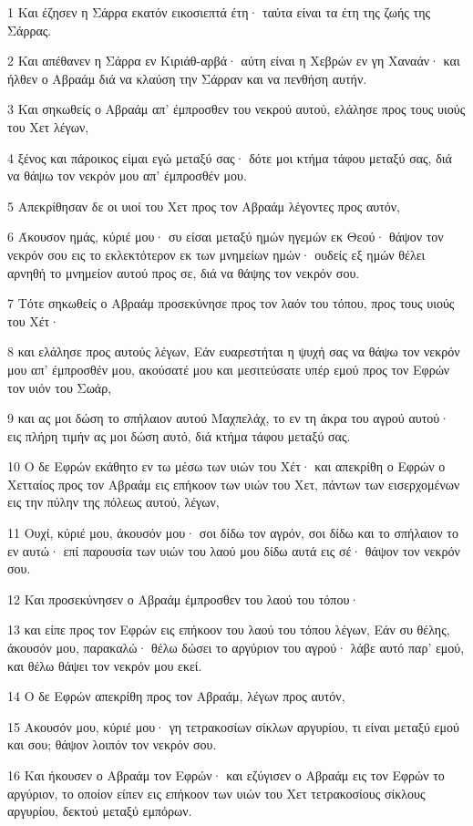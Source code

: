 \par 1 Και έζησεν η Σάρρα εκατόν εικοσιεπτά έτη· ταύτα είναι τα έτη της ζωής της Σάρρας.
\par 2 Και απέθανεν η Σάρρα εν Κιριάθ-αρβά· αύτη είναι η Χεβρών εν γη Χαναάν· και ήλθεν ο Αβραάμ διά να κλαύση την Σάρραν και να πενθήση αυτήν.
\par 3 Και σηκωθείς ο Αβραάμ απ' έμπροσθεν του νεκρού αυτού, ελάλησε προς τους υιούς του Χετ λέγων,
\par 4 ξένος και πάροικος είμαι εγώ μεταξύ σας· δότε μοι κτήμα τάφου μεταξύ σας, διά να θάψω τον νεκρόν μου απ' έμπροσθέν μου.
\par 5 Απεκρίθησαν δε οι υιοί του Χετ προς τον Αβραάμ λέγοντες προς αυτόν,
\par 6 Άκουσον ημάς, κύριέ μου· συ είσαι μεταξύ ημών ηγεμών εκ Θεού· θάψον τον νεκρόν σου εις το εκλεκτότερον εκ των μνημείων ημών· ουδείς εξ ημών θέλει αρνηθή το μνημείον αυτού προς σε, διά να θάψης τον νεκρόν σου.
\par 7 Τότε σηκωθείς ο Αβραάμ προσεκύνησε προς τον λαόν του τόπου, προς τους υιούς του Χέτ·
\par 8 και ελάλησε προς αυτούς λέγων, Εάν ευαρεστήται η ψυχή σας να θάψω τον νεκρόν μου απ' έμπροσθέν μου, ακούσατέ μου και μεσιτεύσατε υπέρ εμού προς τον Εφρών τον υιόν του Σωάρ,
\par 9 και ας μοι δώση το σπήλαιον αυτού Μαχπελάχ, το εν τη άκρα του αγρού αυτού· εις πλήρη τιμήν ας μοι δώση αυτό, διά κτήμα τάφου μεταξύ σας.
\par 10 Ο δε Εφρών εκάθητο εν τω μέσω των υιών του Χέτ· και απεκρίθη ο Εφρών ο Χετταίος προς τον Αβραάμ εις επήκοον των υιών του Χετ, πάντων των εισερχομένων εις την πύλην της πόλεως αυτού, λέγων,
\par 11 Ουχί, κύριέ μου, άκουσόν μου· σοι δίδω τον αγρόν, σοι δίδω και το σπήλαιον το εν αυτώ· επί παρουσία των υιών του λαού μου δίδω αυτά εις σέ· θάψον τον νεκρόν σου.
\par 12 Και προσεκύνησεν ο Αβραάμ έμπροσθεν του λαού του τόπου·
\par 13 και είπε προς τον Εφρών εις επήκοον του λαού του τόπου λέγων, Εάν συ θέλης, άκουσόν μου, παρακαλώ· θέλω δώσει το αργύριον του αγρού· λάβε αυτό παρ' εμού, και θέλω θάψει τον νεκρόν μου εκεί.
\par 14 Ο δε Εφρών απεκρίθη προς τον Αβραάμ, λέγων προς αυτόν,
\par 15 Ακουσόν μου, κύριέ μου· γη τετρακοσίων σίκλων αργυρίου, τι είναι μεταξύ εμού και σου; θάψον λοιπόν τον νεκρόν σου.
\par 16 Και ήκουσεν ο Αβραάμ τον Εφρών· και εζύγισεν ο Αβραάμ εις τον Εφρών το αργύριον, το οποίον είπεν εις επήκοον των υιών του Χετ τετρακοσίους σίκλους αργυρίου, δεκτού μεταξύ εμπόρων.
